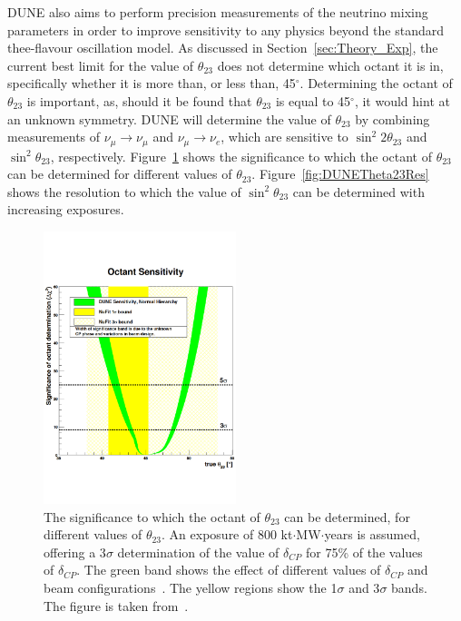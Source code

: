 DUNE also aims to perform precision measurements of the neutrino mixing parameters in order to improve sensitivity to any physics beyond the standard thee-flavour oscillation model. As discussed in Section~\ref{sec:Theory_Exp}, the current best limit for the value of $\theta_{23}$ does not determine which octant it is in, specifically whether it is more than, or less than, 45$^{\circ}$. Determining the octant of $\theta_{23}$ is important, as, should it be found that $\theta_{23}$ is equal to 45$^{\circ}$, it would hint at an unknown symmetry. DUNE will determine the value of $\theta_{23}$ by combining measurements of $\nu_{\mu} \rightarrow \nu_{\mu}$ and $\nu_{\mu} \rightarrow \nu_{e}$, which are sensitive to $\sin^{2}2\theta_{23}$ and $\sin^2\theta_{23}$, respectively. Figure~\ref{fig:DUNEOctantDetermination} shows the significance to which the octant of $\theta_{23}$ can be determined for different values of $\theta_{23}$. Figure~\ref{fig:DUNETheta23Res} shows the resolution to which the value of $\sin^{2}\theta_{23}$ can be determined with increasing exposures. \\

\begin{figure}
  \centering
  \includegraphics[width=0.5\textwidth]{DUNEOctantDetermination}
  \caption[The significance to which the octant of $\theta_{23}$ can be determined, for different values of $\theta_{23}$]
          {The significance to which the octant of $\theta_{23}$ can be determined, for different values of $\theta_{23}$. An exposure of 800 kt$\cdot$MW$\cdot$years is assumed, offering a 3$\sigma$ determination of the value of $\delta_{CP}$ for 75\% of the values of $\delta_{CP}$. The green band shows the effect of different values of $\delta_{CP}$ and beam configurations~\citep{DUNECDR_V3}. The yellow regions show the 1$\sigma$ and 3$\sigma$ bands. The figure is taken from~\citep{DUNECDR_V2}.}
  \label{fig:DUNEOctantDetermination}
\end{figure}

